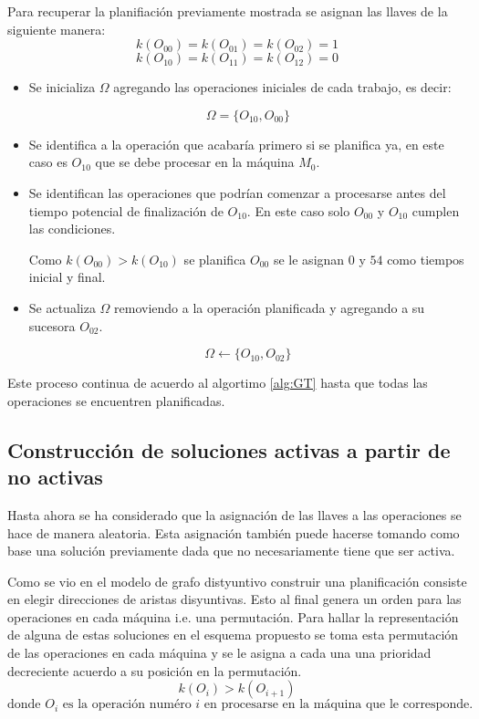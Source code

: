Para recuperar la planifiación previamente mostrada se asignan las llaves de la siguiente manera: \[k(O_{00})=k(O_{01})=k(O_{02})=1\]  \[k(O_{10})=k(O_{11})=k(O_{12})=0\]
\begin{itemize}
    \item Se inicializa $\Omega$ agregando las operaciones iniciales de cada trabajo, es decir:

\[\Omega = \{O_{10},O_{00}\}\]

     \item Se identifica a la operación que acabaría primero si se planifica ya, en este caso es $O_{10}$ que se debe procesar en la máquina $M_0$. 

     \item Se identifican las operaciones que podrían comenzar a procesarse antes del tiempo potencial de finalización de $O_{10}$. En este caso solo $O_{00}$ y  $O_{10}$ cumplen las condiciones.

Como $k(O_{00})>k(O_{10})$ se planifica $O_{00}$ se le asignan $0$ y $54$ como tiempos inicial y final.

     \item Se actualiza $\Omega$ removiendo a la operación planificada y agregando a su sucesora $O_{02}$.

\[\Omega\leftarrow \{O_{10},O_{02}\}\]
\end{itemize}
Este proceso continua de acuerdo al algortimo \ref{alg:GT} hasta que todas las operaciones se encuentren planificadas.\\ 

\subsection{Construcción de soluciones activas a partir de no activas}

Hasta ahora se ha considerado que la asignación de las llaves a las operaciones se hace de manera aleatoria. Esta asignación también puede hacerse tomando como base una solución previamente dada que no necesariamente tiene que ser activa. 

Como se vio en el modelo de grafo distyuntivo construir una planificación consiste en elegir direcciones de aristas disyuntivas. Esto al final genera un orden para las operaciones en cada máquina i.e. una permutación. Para hallar la representación de alguna de estas soluciones en el esquema propuesto se toma esta permutación de las operaciones en cada máquina y se le asigna a cada una una prioridad decreciente acuerdo a su posición en la permutación.
\[k(O_i)>k(O_{i+1})\]
\[\text{donde }O_i\text{ es la operación numéro $i$ en procesarse en la máquina que le corresponde.}\]

